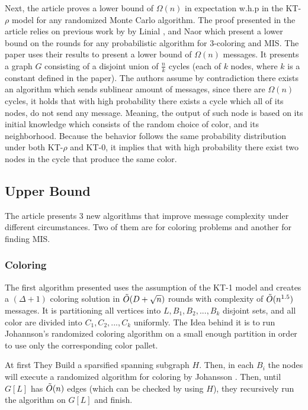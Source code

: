 \documentclass[11pt]{article}
\begin{document}
Next, the article proves a lower bound of $\Omega(n)$ in expectation w.h.p in the KT-$\rho$ model for any randomized Monte Carlo algorithm.
The proof presented in the article relies on previous work by by Linial \cite{Linial}, and Naor \cite{Naor} which present a lower bound on the rounds for any probabilistic algorithm for 3-coloring and MIS. The paper uses their results to present a lower bound of $\Omega(n)$ messages. It presents a graph $G$ consisting of a disjoint union of $\frac{n}{k}$ cycles (each of $k$ nodes, where $k$ is a constant defined in the paper). The authors assume by contradiction there exists an algorithm which sends sublinear amount of messages, since there are $\Omega(n)$ cycles, it holds that with high probability there exists a cycle which all of its nodes, do not send any message. Meaning, the output of such node is based on its initial knowledge which consists of the random choice of color, and its neighborhood. Because the behavior follows the same probability distribution under both KT-$\rho$ and KT-$0$, it implies that with high probability there exist two nodes in the cycle that produce the same color.

\subsection*{Upper Bound}
The article presents 3 new algorithms that improve message complexity under different circumstances. Two of them are for coloring problems and another for finding MIS.

\subsubsection*{Coloring}

The first algorithm presented uses the assumption of the KT-1 model and creates a $(\Delta+1)$ coloring solution in ${\Tilde{O}}(D+\sqrt{n})$ rounds with complexity of ${\Tilde{O}}(n^{1.5})$ messages. It is partitioning all vertices into $L, B_1, B_2, ..., B_k$ disjoint sets, and all color are divided into $C_1, C_2, ..., C_k$ uniformly. The Idea behind it is to run Johannson's \cite{Johansson} randomized coloring algorithm on a small enough partition in order to use only the corresponding color pallet. 

At first They Build a sparsified spanning subgraph $H$. Then, in each $B_i$ the nodes will execute a randomized algorithm for coloring by Johansson \cite{Johansson}. Then, until $G[L]$ has $\Tilde{O}(n)$ edges (which can be checked by using $H$), they recursively run the algorithm on $G[L]$ and finish.
\end{document}
